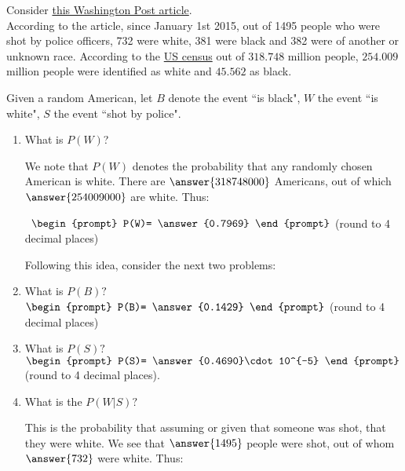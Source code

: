 \documentclass{ximera}
\begin{document}
\begin{question}
Consider  \href{https://www.washingtonpost.com/amphtml/news/post-nation/wp/2016/07/11/arent-more-white-people-than-black-people-killed-by-police-yes-but-no/}{this Washington Post article}.\\

According to the article, since January 1st 2015, out of 1495 people who were shot by police officers, 732 were white,  381 were black and 382 were of another or unknown race.    According to the \href{https://www.census.gov/content/dam/Census/library/publications/2015/demo/p25-1143.pdf}{US census} out of $318.748$ million people, $254.009$ million people were identified as white and $45.562$ as black.

Given a random American, let $B$ denote the event ``is black", $W$ the event ``is white", $S$ the event ``shot by police".

\begin{enumerate}
\item What is $P(W)$? 
\begin{explanation}
We note that $P(W)$ denotes the probability that any randomly chosen American is white.  There are $\answer{318748000}$ Americans, out of which $\answer{254009000}$ are white.  Thus:
\end{explanation}



\  $ \begin{prompt}
    P(W)= \answer{0.7969}
  \end{prompt}$ (round to 4 decimal places)
  
  Following this idea, consider the next two problems:
  
\item What is $P(B)?$\ $ \begin{prompt}
    P(B)= \answer{0.1429}
  \end{prompt}$ (round to 4 decimal places)
\item What is $P(S)?$ 
$\begin{prompt}
P(S)= \answer{0.4690}\cdot 10^{-5}
\end{prompt}$ (round to 4 decimal places).



\item What is the $P(W|S)?$ 

This is the probability that assuming or given that someone was shot, that they were white.  We see that $\answer{1495}$ people were shot, out of whom $\answer{732}$ were white.  Thus:



\end{enumerate}
\end{question}
\end{document}
